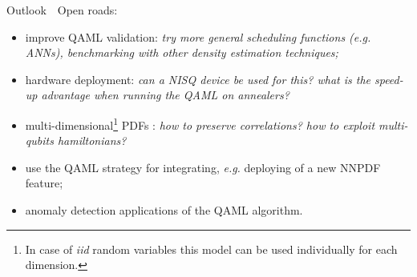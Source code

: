 \documentclass[8pt, xcolor={svgnames}, hyperref={colorlinks, linkcolor=black, citecolor=amethyst, urlcolor=amethyst}]{beamer}
\begin{document}
\begin{frame}{Outlook}
\large
\faArrowCircleRight\,\, Open roads:
\pause
\begin{itemize}
  \item[\faExternalLink] improve QAML validation: \textcolor{amethyst}{\textit{
  try more general scheduling functions (e.g. ANNs), benchmarking with other 
  density estimation techniques;} } 
  \pause
  \item[\faExternalLink] hardware deployment: \textcolor{amethyst}{\textit{can a NISQ device be used for this?
  what is the speed-up advantage when running the QAML on annealers?}}
  \item[\faExternalLink] multi-dimensional\footnote<2->{In case of \textit{iid} 
  random variables this model can be used individually for each dimension.} PDFs
  : \textcolor{amethyst}{\textit{how to preserve correlations?
  how to exploit multi-qubits hamiltonians?}}
  \pause
  \item[\faExternalLink] use the QAML strategy for integrating, \textit{e.g.} 
  deploying of a new NNPDF feature;
  \pause
  \item[\faExternalLink] anomaly detection applications of the QAML algorithm.
\end{itemize}
\end{frame}
\end{document}
